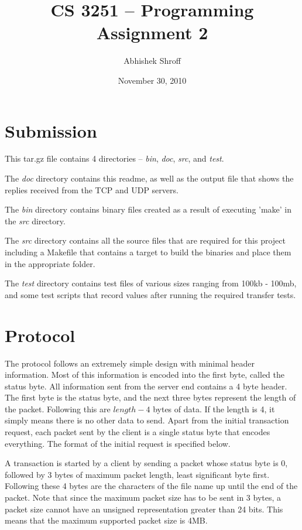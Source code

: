 \documentclass[11pt]{article}
\begin{document}
\title{CS 3251 -- Programming Assignment 2}
\author{Abhishek Shroff}
\date{November 30, 2010}
\maketitle

\section{Submission}
This tar.gz file contains 4 directories -- \emph{bin}, \emph{doc}, \emph{src}, and \emph{test}.

The \emph{doc} directory contains this readme, as well as the output file that shows the replies received from the TCP and UDP servers.

The \emph{bin} directory contains binary files created as a result of executing 'make' in the \emph{src} directory.

The \emph{src} directory contains all the source files that are required for this project including a Makefile that contains a target to build the binaries and place them in the appropriate folder.

The \emph{test} directory contains test files of various sizes ranging from 100kb - 100mb, and some test scripts that record values after running the required transfer tests.

\section{Protocol}
The protocol follows an extremely simple design with minimal header information. Most of this information is encoded into the first byte, called the status byte. All information sent from the server end contains a 4 byte header. The first byte is the status byte, and the next three bytes represent the length of the packet. Following this are $length-4$ bytes of data. If the length is 4, it simply means there is no other data to send. Apart from the initial transaction request, each packet sent by the client is a single status byte that encodes everything. The format of the initial request is specified below.

A transaction is started by a client by sending a packet whose status byte is 0, followed by 3 bytes of maximum packet length, least significant byte first. Following these 4 bytes are the characters of the file name up until the end of the packet. Note that since the maximum packet size has to be sent in 3 bytes, a packet size cannot have an unsigned representation greater than 24 bits. This means that the maximum supported packet size is 4MB.
\end{document}
